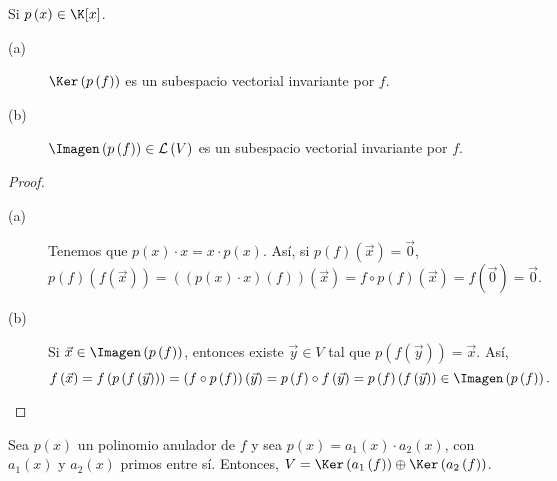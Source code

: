Si $\displaystyle p\left(x\right) \in \K[x] $.
\begin{fprop}[]
\normalfont 
\begin{description}
\item[(a)] $\displaystyle \Ker\left(p\left(f\right)\right) $ es un subespacio vectorial invariante por $\displaystyle f $.
\item[(b)] $\displaystyle \Imagen\left(p\left(f\right)\right)\in \mathcal{L}\left(V\right) $ es un subespacio vectorial invariante por $\displaystyle f $.
\end{description}
\end{fprop}
\begin{proof}
\begin{description}
\item[(a)] Tenemos que $\displaystyle p\left(x\right) \cdot x = x \cdot p\left(x\right) $. Así, si $\displaystyle p\left(f\right) \left(\vec{x}\right) = \vec{0} $, 
	\[p\left(f\right)\left(f\left(\vec{x}\right)\right) = \left(\left(p\left(x\right) \cdot x\right)\left(f\right)\right)\left(\vec{x}\right) = f \circ p\left(f\right)\left(\vec{x}\right) = f\left(\vec{0}\right) = \vec{0} .\]
\item[(b)] Si $\displaystyle \vec{x} \in \Imagen\left(p\left(f\right)\right) $, entonces existe $\displaystyle \vec{y} \in V $ tal que $\displaystyle p\left(f\left(\vec{y}\right)\right) = \vec{x} $. Así,
	\[f\left(\vec{x}\right) = f\left(p\left(f\left(\vec{y}\right)\right)\right) = \left(f\circ p\left(f\right)\right)\left(\vec{y}\right) = p\left(f\right) \circ f\left(\vec{y}\right) = p\left(f\right)\left( f\left(\vec{y}\right) \right) \in \Imagen\left(p\left(f\right)\right).\]	
\end{description}
\end{proof}
\begin{ftheorem}[]
\normalfont Sea $\displaystyle p\left(x\right) $ un polinomio anulador de $\displaystyle f $ y sea $\displaystyle p\left(x\right) = a_{1}\left(x\right) \cdot a_{2}\left(x\right) $, con $\displaystyle a_{1}\left(x\right) $ y $\displaystyle a_{2}\left(x\right) $ primos entre sí. Entonces, $\displaystyle V = \Ker\left(a_{1}\left(f\right)\right) \oplus \Ker\left(a_{2}\left(f\right)\right) $.
\end{ftheorem}
